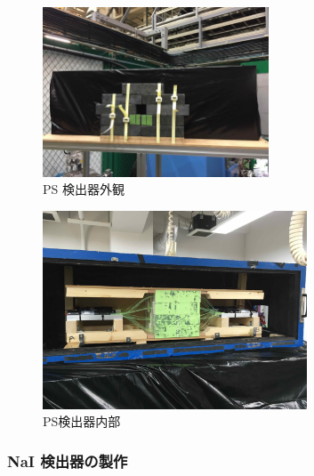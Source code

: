 \begin{figure} [H]
\centering
\includegraphics[width=0.6\textwidth]{figure/hayakawa/PS_real.jpg}
\caption{PS 検出器外観}
\end{figure}
\begin{figure}[H]
\centering
\includegraphics[width=0.7\textwidth]{figure/hayakawa/PS_in.jpg}
\caption{PS検出器内部}
\end{figure}

\subsubsection{NaI 検出器の製作}

